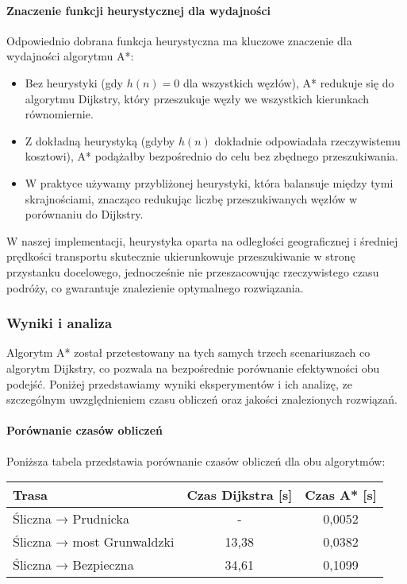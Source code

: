 \documentclass[12pt,a4paper]{article}
\begin{document}
\paragraph{Znaczenie funkcji heurystycznej dla wydajności}
Odpowiednio dobrana funkcja heurystyczna ma kluczowe znaczenie dla wydajności algorytmu A*:

\begin{itemize}
    \item Bez heurystyki (gdy $h(n) = 0$ dla wszystkich węzłów), A* redukuje się do algorytmu Dijkstry, który przeszukuje węzły we wszystkich kierunkach równomiernie.
    \item Z dokładną heurystyką (gdyby $h(n)$ dokładnie odpowiadała rzeczywistemu kosztowi), A* podążałby bezpośrednio do celu bez zbędnego przeszukiwania.
    \item W praktyce używamy przybliżonej heurystyki, która balansuje między tymi skrajnościami, znacząco redukując liczbę przeszukiwanych węzłów w porównaniu do Dijkstry.
\end{itemize}

W naszej implementacji, heurystyka oparta na odległości geograficznej i średniej prędkości transportu skutecznie ukierunkowuje przeszukiwanie w stronę przystanku docelowego, jednocześnie nie przeszacowując rzeczywistego czasu podróży, co gwarantuje znalezienie optymalnego rozwiązania.

\subsubsection{Wyniki i analiza}
Algorytm A* został przetestowany na tych samych trzech scenariuszach co algorytm Dijkstry, co pozwala na bezpośrednie porównanie efektywności obu podejść. Poniżej przedstawiamy wyniki eksperymentów i ich analizę, ze szczególnym uwzględnieniem czasu obliczeń oraz jakości znalezionych rozwiązań.

\paragraph{Porównanie czasów obliczeń}
Poniższa tabela przedstawia porównanie czasów obliczeń dla obu algorytmów:

\begin{center}
\begin{tabular}{|l|c|c|}
\hline
\textbf{Trasa} & \textbf{Czas Dijkstra [s]} & \textbf{Czas A* [s]} \\
\hline
Śliczna → Prudnicka & - & 0,0052 \\
Śliczna → most Grunwaldzki & 13,38 & 0,0382 \\
Śliczna → Bezpieczna & 34,61 & 0,1099 \\
\hline
\end{tabular}
\end{center}
\end{document}
